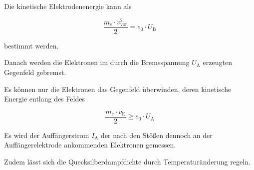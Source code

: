 Die kinetische Elektrodenenergie kann als

\begin{equation}
    \frac{m_e \cdot v_\text{vor}^2}{2} = e_0 \cdot U_\text{B}
\end{equation}

bestimmt werden.

Danach werden die Elektronen im durch die Bremsspannung $U_\text{A}$ erzeugten
Gegenfeld gebremst. 

Es können nur die Elektronen das Gegenfeld überwinden, deren kinetische
Energie entlang des Feldes 

\begin{equation}
    \frac{m_e \cdot v_\text{E}}{2} \geq e_0 \cdot U_\text{A}
\end{equation}

Es wird der Auffängerstrom $I_\text{A}$ der nach den Stößen dennoch an der Auffängerelektrode ankommenden
Elektronen gemessen.

Zudem lässt sich die Quecksilberdampfdichte durch Temperaturänderung regeln.

